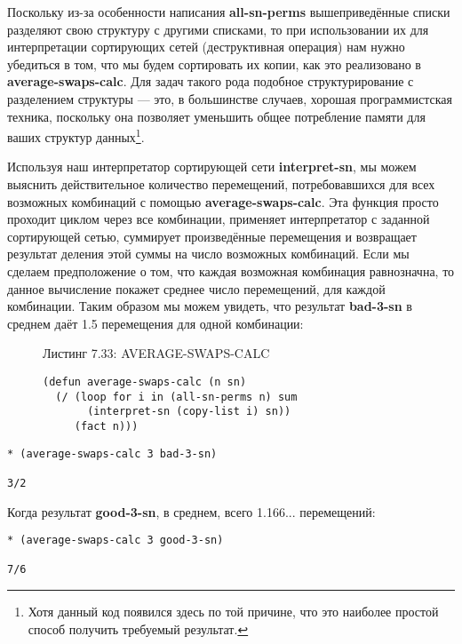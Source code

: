 Поскольку из-за особенности написания \textbf{all-sn-perms} вышеприведённые списки разделяют свою структуру с другими списками, то при использовании их для интерпретации сортирующих сетей (деструктивная операция) нам нужно убедиться в том, что мы будем сортировать их копии, как это реализовано в \textbf{average-swaps-calc}. Для задач такого рода подобное структурирование с разделением структуры --- это, в большинстве случаев, хорошая программистская техника, поскольку она позволяет уменьшить общее потребление памяти для ваших структур данных\footnote{Хотя данный код появился здесь по той причине, что это наиболее простой способ получить требуемый результат.}.

Используя наш интерпретатор сортирующей сети \textbf{interpret-sn}, мы можем выяснить действительное количество перемещений, потребовавшихся для всех возможных комбинаций с помощью \textbf{average-swaps-calc}. Эта функция просто проходит циклом через все комбинации, применяет интерпретатор с заданной сортирующей сетью, суммирует произведённые перемещения и возвращает результат деления этой суммы на число возможных комбинаций. Если мы сделаем предположение о том, что каждая возможная комбинация равнозначна, то данное вычисление покажет среднее число перемещений, для каждой комбинации. Таким образом мы можем увидеть, что результат \textbf{bad-3-sn} в среднем даёт 1.5 перемещения для одной комбинации:

\begin{figure}Листинг 7.33: AVERAGE-SWAPS-CALC\label{listing_7.33}
\listbegin
\begin{verbatim}
(defun average-swaps-calc (n sn)
  (/ (loop for i in (all-sn-perms n) sum
       (interpret-sn (copy-list i) sn))
     (fact n)))
\end{verbatim}
\listend
\end{figure}

\begin{verbatim}
* (average-swaps-calc 3 bad-3-sn)

3/2
\end{verbatim}

Когда результат \textbf{good-3-sn}, в среднем, всего 1.166... перемещений:

\begin{verbatim}
* (average-swaps-calc 3 good-3-sn)

7/6
\end{verbatim}


